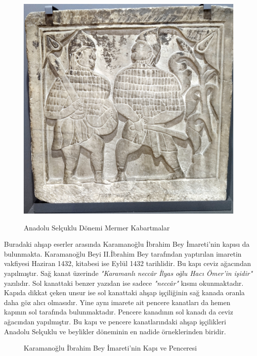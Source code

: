 \begin{figure}[H]
{        \includegraphics[height=0.3\textheight,width=0.3\textheight,keepaspectratio=false]{assets/savasci_as.jpg}
    }
    \caption{Anadolu Selçuklu Dönemi Mermer Kabartmalar}
\end{figure}
\indent Buradaki ahşap eserler arasında Karamanoğlu İbrahim Bey İmareti'nin kapısı da bulunmakta. Karamanoğlu Beyi II.İbrahim Bey tarafından yaptırılan imaretin vakfiyesi Haziran 1432, kitabesi ise Eylül 1432 tarihlidir. Bu kapı ceviz ağacından yapılmıştır. Sağ kanat üzerinde \textit{"Karamanlı neccâr İlyas oğlu Hacı Ömer'in işidir"} yazılıdır. Sol kanattaki benzer yazıdan ise sadece \textit{"neccâr"} kısmı okunmaktadır. Kapıda dikkat çeken unsur ise sol kanattaki ahşap işçiliğinin sağ kanada oranla daha göz alıcı olmasıdır. Yine aynı imarete ait pencere kanatları da hemen kapının sol tarafında bulunmaktadır. Pencere kanadının sol kanadı da ceviz ağacından yapılmıştır. Bu kapı ve pencere kanatlarındaki ahşap işçilikleri Anadolu Selçuklu ve beylikler döneminin en nadide örneklerinden biridir.\cite{dia_6}
\begin{figure}[H]
    \centering
    \hspace{10pt}
    \caption{Karamanoğlu İbrahim Bey İmareti'nin Kapı ve Penceresi}
\end{figure}